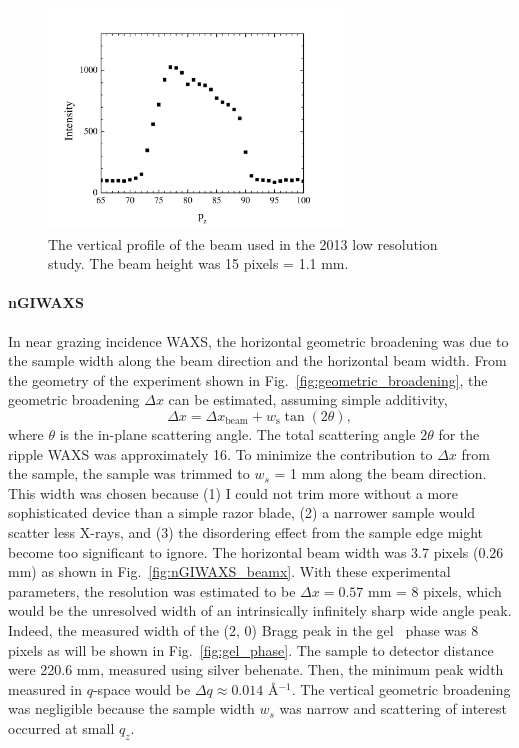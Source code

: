 \begin{figure}[p]
  \centering
  \includegraphics[width=0.7\textwidth]{figures/ripple/MMs/laxs/beamz_lr}
  \caption{The vertical profile of the beam used in the 2013 low resolution study.
  The beam height was 15 pixels = 1.1 mm.}
  \label{fig:ripple_lr_beamz}
\end{figure}

\paragraph{nGIWAXS}
In near grazing incidence WAXS, 
the horizontal geometric broadening was due to the
sample width along the beam direction and the horizontal beam width.
From the geometry of the experiment shown in Fig.~\ref{fig:geometric_broadening}, 
the geometric broadening $\Delta x$ can be estimated,
assuming simple additivity,
\[
\Delta x = \Delta x_\textrm{beam} + w_\textrm{s}\tan(2\theta),
\] 
where $\theta$ is the in-plane scattering angle.
The total scattering angle $2\theta$ for the ripple WAXS was approximately 
16\textdegree. 
To minimize the contribution to $\Delta x$ from the sample, 
the sample was trimmed to $w_s$ = 1 mm along the beam direction. 
This width was chosen because (1) I could not trim more
without a more sophisticated device than a simple razor blade, (2) a 
narrower sample would scatter less X-rays, and (3) the disordering effect from 
the sample edge might become too significant to ignore. 
The horizontal beam width was 3.7 pixels (0.26 mm) as shown in
Fig.~\ref{fig:nGIWAXS_beamx}.
With these experimental parameters, 
the resolution was estimated to be $\Delta x = 0.57$ mm = 8 pixels, 
which would be the unresolved width of an intrinsically infinitely sharp 
wide angle peak.
Indeed, the measured width of the (2, 0) Bragg peak in the gel \LbetaI\ phase
was 8 pixels as will be shown in Fig.~\ref{fig:gel_phase}.
The sample to detector distance were 220.6 mm, measured using silver behenate.
Then, the minimum peak width measured in $q$-space would be
$\Delta q \approx 0.014$ \AA$^{-1}$. The vertical geometric broadening 
was negligible because the sample width $w_s$ was narrow and scattering
of interest occurred at small $q_z$.


